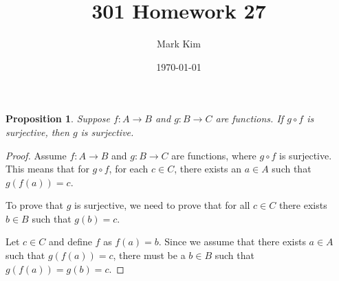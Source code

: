 \documentclass[12pt]{amsart}
\title{301 Homework 27}
\author{Mark Kim}
\date{\today}
\newtheorem*{proposition}{Proposition}
\begin{document}
\maketitle

\begin{proposition}
Suppose $f\colon A\rightarrow B$ and $g\colon B\rightarrow C$ are functions.  If $g\circ f$ is surjective, then $g$ is surjective.
\end{proposition}

\begin{proof}
Assume $f\colon A\rightarrow B$ and $g\colon B\rightarrow C$ are functions, where $g\circ f$ is surjective.  This means that for $g\circ f$, for each $c\in C$, there exists an $a\in A$ such that $g(f(a))=c$.

To prove that $g$ is surjective, we need to prove that for all $c\in C$ there exists $b\in B$ such that $g(b)=c$.

Let $c\in C$ and define $f$ as $f(a)=b$.  Since we assume that there exists $a\in A$ such that $g(f(a))=c$, there must be a $b\in B$ such that $g(f(a))=g(b)=c$.
\end{proof}
\end{document}
